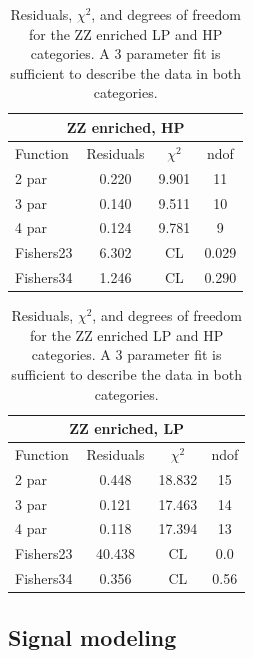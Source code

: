 \begin{table}[htb]
\centering
\begin{tabular}{|l c c c |}
\hline
\multicolumn{4}{|c|}{ZZ enriched, HP}\\
\hline
Function & Residuals & $\chi^2$ & ndof \\
\hline
2 par & 0.220 & 9.901 & 11 \\
3 par & 0.140 & 9.511 & 10 \\
4 par & 0.124 & 9.781 & 9 \\
\hline
\hline
Fishers23 & 6.302& CL & 0.029\\
Fishers34 & 1.246& CL & 0.290\\
\hline
\end{tabular}
\quad
\begin{tabular}{|l c c c |}
\hline
\multicolumn{4}{|c|}{ZZ enriched, LP}\\
\hline
Function & Residuals & $\chi^2$ & ndof \\
\hline
2 par & 0.448 & 18.832 & 15 \\
3 par & 0.121 & 17.463 & 14 \\
4 par & 0.118 & 17.394 & 13 \\
\hline
\hline
Fishers23 & 40.438& CL & 0.0\\
Fishers34 & 0.356& CL & 0.56\\
\hline
\end{tabular}
\caption{Residuals, $\chi^{2}$, and degrees of freedom for the ZZ enriched LP and HP categories. A 3 parameter fit is sufficient to describe the data in both categories.}
\label{tab:ZZ_enriched}
\end{table}

\clearpage
\subsection{Signal modeling}
\label{sec:searchI:sig}

